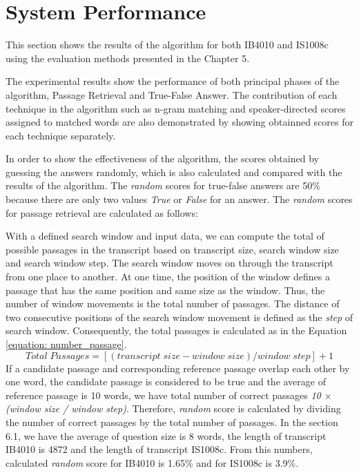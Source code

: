 \section{System Performance}


This section shows the results of the algorithm for both IB4010 and IS1008c using the evaluation methods presented in the Chapter 5.

The experimental results show the performance of both principal phases of the algorithm, Passage Retrieval and True-False Answer. The contribution of each technique in the algorithm such as n-gram matching and speaker-directed scores assigned to matched words are also demonstrated by showing obtainned scores for each technique separately. 

In order to show the effectiveness of the algorithm, the scores obtained by guessing the answers randomly, which is also calculated and compared with the results of the algorithm. The \textit{random} scores for true-false answers are 50\% because there are only two values \textit{True} or \textit{False} for an answer. The \textit{random} scores for passage retrieval are calculated as follows:

With a defined search window and input data, we can compute the total of possible passages in the transcript based on transcript size, search window size and search window step. The search window moves on through the transcript from one place to another. At one time, the position of the window defines a passage that has the same position and same size as the window. Thus, the number of window movements is the total number of passages. The distance of two consecutive positions of the search window movement is defined as the \textit{step} of search window. Consequently, the total passages is calculated as in the Equation \ref{equation: number_passage}.
  \begin{equation}
\label{equation: number_passage}
	Total \; Passages = [(transcript \; size - window \; size)/window \; step] + 1
\end{equation}
   If a candidate passage and corresponding reference passage overlap each other by one word, the candidate passage is considered to be true and the average of reference passage is 10 words, we have total number of correct passages \textit{10 \ensuremath{\times} (window size / window step)}. Therefore, \textit{random} score is calculated by dividing the number of correct passages by the total number of passages. In the section 6.1, we have the average of question size is 8 words, the length of transcript IB4010 is 4872 and the length of transcript IS1008c. From this numbers, calculated \textit{random} score for IB4010 is 1.65\% and for IS1008c is 3.9\%.

